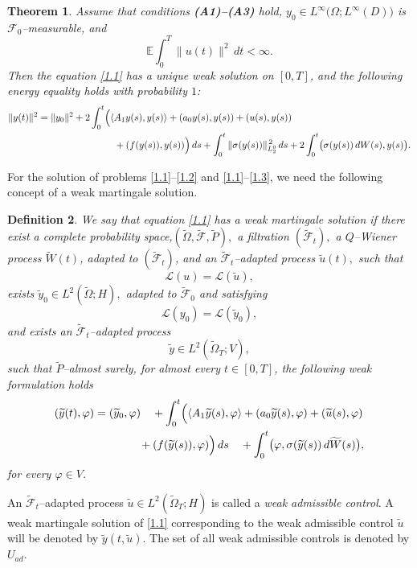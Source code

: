 \documentclass[a4paper,12pt]{article}
\newtheorem{definition}{Definition}[section]
\newtheorem{theorem}[definition]{Theorem}
\numberwithin{equation}{section}
\def\E{\mathbb{E}}
\begin{document}
\begin{theorem}{\cite{20}}\label{Th:2.1}
Assume that conditions {\rm{\bf(A1)--(A3)}} hold,
$
y_0\in L^\infty\!\bigl(\Omega;L^\infty(D)\bigr)
$
is $\mathcal{F}_0$--measurable, and
\[
\E\int_0^T \|u(t)\|^2\,dt < \infty.
\]
Then the equation \eqref{1.1} has a unique weak solution on $[0,T]$,
and the following energy equality holds with probability $1$:
\begin{equation}
\begin{aligned}
\|y(t)\|^2
&=
\|y_0\|^2
+
2\int_0^t
\Bigl(
\langle A_1y(s),y(s)\rangle
+
(a_0y(s),y(s))
+
(u(s),y(s))
\\
&\hspace{2.8cm}
+
(f(y(s)),y(s))
\Bigr)\,ds
+
\int_0^t
\|\sigma(y(s))\|_{L_2^0}^{\,2}\,ds
+
2\int_0^t
\bigl(
\sigma(y(s))\,dW(s),y(s)
\bigr).
\end{aligned}
\label{2.6}
\end{equation}
\end{theorem}
For the solution of problems
\eqref{1.1}--\eqref{1.2}
and
\eqref{1.1}--\eqref{1.3},
we need the following concept of a weak martingale solution.
\begin{definition}
We say that equation \eqref{1.1} has a {\it weak martingale solution} if
there exist a complete probability space,$(\widetilde{\Omega}, \widetilde{\mathcal F}, \widetilde P),$
a filtration
$(\widetilde{\mathcal F}_t),$
a $Q$--Wiener process $\widetilde W(t)$, adapted to $(\widetilde{\mathcal F}_t)$, and an
$\widetilde{\mathcal F}_t$--adapted process
$
\widetilde u(t),
$
such that
\[
\mathcal L(u)
=
\mathcal L(\widetilde u),
\]
exists $
\widetilde y_0\in L^2(\widetilde\Omega;H),
$ adapted to $\widetilde{\mathcal F}_0$ and satisfying
\[
\mathcal L(y_0)
=
\mathcal L(\widetilde y_0),
\]
and exists an
$\widetilde{\mathcal F}_t$--adapted process
\[
\widetilde y
\in
L^2(\widetilde\Omega_T;V),
\]
such that $\widetilde P$--almost surely, for almost every
$t\in[0,T]$, the following weak formulation holds
\begin{equation}
\begin{aligned}
(\widetilde y(t),\varphi)
&=
(\widetilde y_0,\varphi)
\quad
+
\int_0^t
\Bigl(
\langle A_1\widetilde y(s),\varphi\rangle
+
(a_0\widetilde y(s),\varphi)
+
(\widetilde u(s),\varphi)
\\
&\qquad\qquad
+
(f(\widetilde y(s)),\varphi)
\Bigr)\,ds
\quad
+
\int_0^t
\bigl(
\varphi,
\sigma(\widetilde y(s))
\,d\widetilde W(s)
\bigr),
\end{aligned}
\label{2.8}
\end{equation}
for every $\varphi\in V$.
\end{definition}
An $\widetilde{\mathcal F}_t$--adapted process
$
\widetilde u
\in
L^2(\widetilde\Omega_T;H)
$
is called a \emph{weak admissible control}. A weak martingale solution of \eqref{1.1}
corresponding to the weak admissible control
$\widetilde u$
will be denoted by $
\widetilde y(t,\widetilde u).$ The set of all weak admissible controls is denoted by $U_{ad}$.
\end{document}
